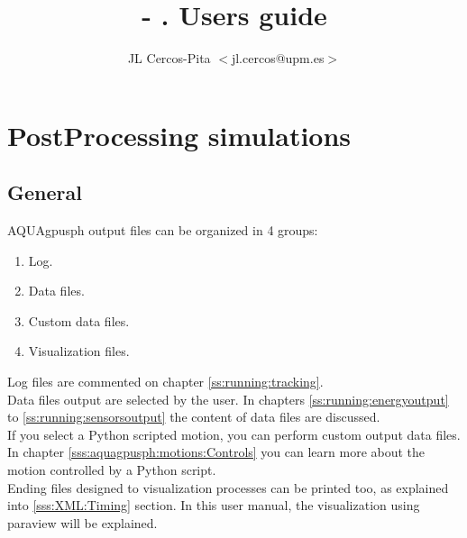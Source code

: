 \documentclass[a4paper,12pt]{book}
\author{JL Cercos-Pita $<$jl.cercos@upm.es$>$}
\title{\NAME- \VERSION.\rcc
\textbf{Users guide}}
\date{\today\\[5.0 in]
\begin{figure}[h!]
  \centering
  \texttt{[image: CC\_88x31]}
\end{figure}
}
\newcommand{\NAME}{AQUAgpusph }
\newcommand{\rc}{\\[0.2 in]}
\begin{document}
\maketitle
\thispagestyle{empty}
%
\newpage
\tableofcontents
\newpage
\newpage









\chapter{PostProcessing simulations}
\label{s:outputFiles}
%
\section{General}
%
\NAME output files can be organized in 4 groups:
%
\begin{enumerate}
	\item Log.
	\item Data files.
	\item Custom data files.
	\item Visualization files.
\end{enumerate}
%
Log files are commented on chapter \ref{ss:running:tracking}.\rc
%
Data files output are selected by the user. In chapters \ref{ss:running:energyoutput} to
\ref{ss:running:sensorsoutput} the content of data files are discussed.\rc
%
If you select a Python scripted motion, you can perform custom output data files. In chapter
\ref{sss:aquagpusph:motions:Controls} you can learn more about the motion controlled by a Python
script.\rc
%
Ending files designed to visualization processes can be printed too, as explained into \ref{sss:XML:Timing}
section. In this user manual, the visualization using paraview will be explained.
%








\end{document}
